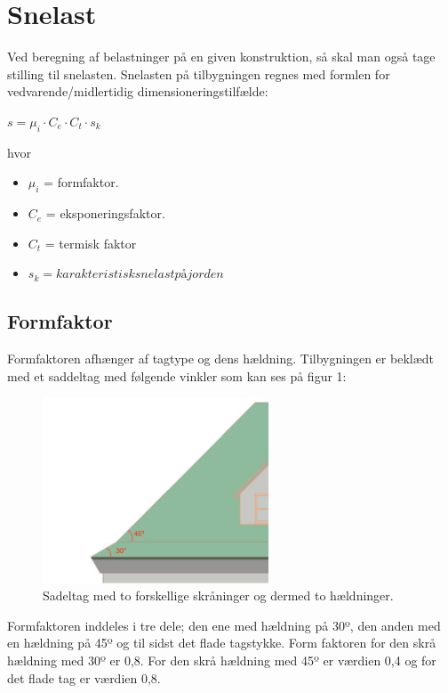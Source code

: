 \section{Snelast}
Ved beregning af belastninger på en given konstruktion, så skal man også tage stilling til snelasten. Snelasten på tilbygningen regnes med formlen for vedvarende/midlertidig dimensioneringstilfælde:

$s = \mu_i \cdot C_e  \cdot  C_t \cdot s_k$

hvor

\begin{itemize}
\item $\mu_i$ = formfaktor.
\item $C_e$ = eksponeringsfaktor.
\item $C_t$ = termisk faktor
\item $s_k = karakteristisk snelast på jorden$
\end{itemize}


\subsection{Formfaktor}
Formfaktoren afhænger af tagtype og dens hældning. Tilbygningen er beklædt med et saddeltag med følgende vinkler som kan ses på figur 1: 

\begin{figure}[H] 
\centering
\includegraphics[width=0.60\textwidth]{billeder/SnelastFigur1}
\caption{Sadeltag med to forskellige skråninger og dermed to hældninger.}
\label{fig:SF1}
\end{figure}

Formfaktoren inddeles i tre dele; den ene med hældning på 30º, den anden med en hældning på 45º og til sidst det flade tagstykke. Form faktoren for den skrå hældning med 30º er 0,8. For den skrå hældning med 45º er værdien 0,4 og for det flade tag er værdien 0,8. 

